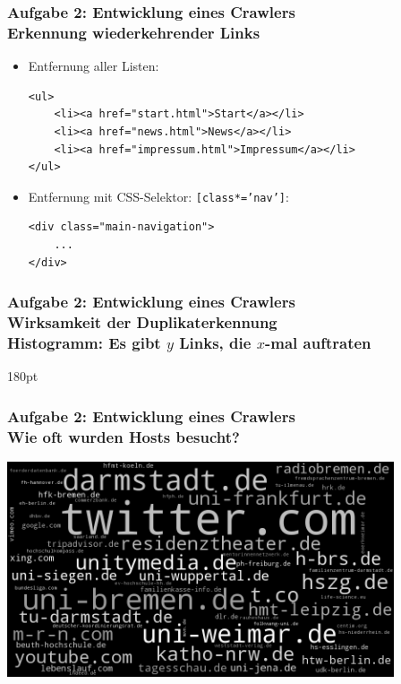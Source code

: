 \documentclass[accentcolor=tud7b,noresetcounter]{tudbeamer}
\begin{document}
  \begin{frame}[fragile]
  	\frametitle{Aufgabe 2: Entwicklung eines Crawlers\\
	Erkennung wiederkehrender Links}
	\begin{itemize}
		\item Entfernung aller Listen:\begin{lstlisting}
<ul>
	<li><a href="start.html">Start</a></li>
	<li><a href="news.html">News</a></li>
	<li><a href="impressum.html">Impressum</a></li>
</ul>
	\end{lstlisting}
	\item Entfernung mit 
CSS-Selektor: \texttt{[class*='nav']}:\begin{lstlisting}
<div class="main-navigation">
	...
</div>
	\end{lstlisting}
	\end{itemize}
 \end{frame}
  
 \begin{frame}[t]
  	\frametitle{Aufgabe 2: Entwicklung eines Crawlers\\
  	Wirksamkeit der Duplikaterkennung\\Histogramm: Es gibt $y$ Links, die 
$x$-mal auftraten}
  \end{frame}
 
	\resizebox {\columnwidth} {180pt} {
	}
	
  \begin{frame}[t]
  	\frametitle{Aufgabe 2: Entwicklung eines Crawlers\\
  	Wie oft wurden Hosts besucht?}
  	
  	\includegraphics[width=\columnwidth, height=180pt]{../aufg02/wordcloud}	
	
  \end{frame}	
	
\end{document}
